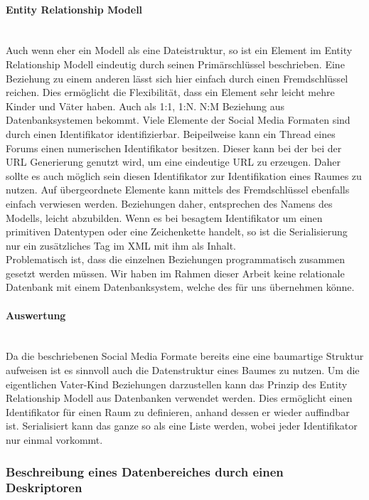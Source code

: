 \documentclass[a4paper]{article}
\begin{document}
	\paragraph{Entity Relationship Modell}\mbox{} \\
	
	Auch wenn eher ein Modell als eine Dateistruktur, so ist ein Element im
	Entity Relationship Modell eindeutig durch seinen Primärschlüssel beschrieben.
	Eine Beziehung zu einem anderen lässt sich hier einfach durch einen
	Fremdschlüssel reichen. Dies ermöglicht die Flexibilität, dass ein Element
	sehr leicht mehre Kinder und Väter haben. Auch als 1:1, 1:N. N:M Beziehung
	aus Datenbanksystemen bekommt. Viele Elemente der Social Media Formaten sind
	durch einen Identifikator identifizierbar. Beipeilweise kann ein Thread eines
	Forums einen numerischen Identifikator besitzen. Dieser kann bei der bei der
	URL Generierung	genutzt wird, um eine eindeutige URL zu erzeugen. Daher sollte
	es auch möglich sein diesen Identifikator zur Identifikation eines Raumes zu
	nutzen. Auf übergeordnete Elemente kann mittels des Fremdschlüssel ebenfalls
	einfach verwiesen werden. Beziehungen daher, entsprechen des Namens des
	Modells, leicht abzubilden.	Wenn es bei besagtem Identifikator um einen
	primitiven Datentypen oder eine Zeichenkette handelt, so ist die
	Serialisierung nur ein zusätzliches Tag im XML mit ihm als Inhalt. \\
	
	Problematisch ist, dass die einzelnen Beziehungen programmatisch zusammen
	gesetzt werden müssen. Wir haben im Rahmen dieser Arbeit keine relationale
	Datenbank mit einem Datenbanksystem, welche des für uns übernehmen könne.
	
	\paragraph{Auswertung}\mbox{} \\
	
	Da die beschriebenen Social Media Formate bereits eine eine baumartige Struktur
	aufweisen ist es sinnvoll auch die Datenstruktur eines Baumes zu nutzen. Um
	die eigentlichen Vater-Kind Beziehungen darzustellen kann das Prinzip des
	Entity Relationship Modell aus Datenbanken verwendet werden. Dies ermöglicht
	einen Identifikator für einen Raum zu definieren, anhand dessen er wieder
	auffindbar ist. Serialisiert kann das ganze so als eine Liste werden, wobei
	jeder Identifikator nur einmal vorkommt.
	
	\subsubsection{Beschreibung eines Datenbereiches durch einen Deskriptoren}
	\label{sec:desk}
	
\end{document}

